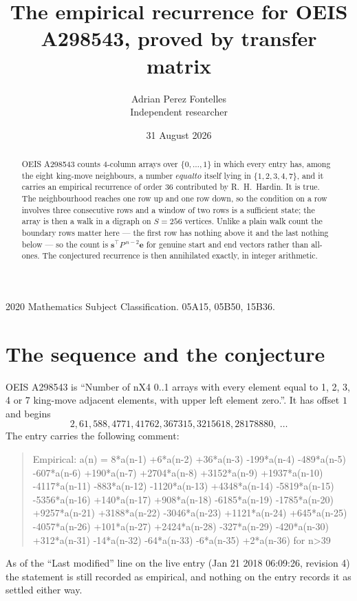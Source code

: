 \documentclass[11pt,a4paper]{article}
\title{The empirical recurrence for OEIS A298543, proved by transfer matrix}
\author{Adrian Perez Fontelles\\ \small Independent researcher}
\date{31 August 2026}
\theoremstyle{plain}
\theoremstyle{definition}
\begin{document}
\maketitle

\begin{abstract}
OEIS A298543 counts $4$-column arrays over $\{0,\dots,1\}$ in which every entry has,
among the eight king-move neighbours, a number $equal to$ itself lying in $\{1,2,3,4,7\}$, and it carries an empirical
recurrence of order $36$ contributed by R.~H.~Hardin. It is true. The neighbourhood
reaches one row up and one row down, so the condition on a row involves three consecutive
rows and a window of two rows is a sufficient state; the array is then a walk in a digraph
on $S=256$ vertices. Unlike a plain walk count the boundary rows matter here --- the first
row has nothing above it and the last nothing below --- so the count is
$\mathbf{s}^{\!\top}P^{\,n-2}\mathbf{e}$ for genuine start and end vectors rather than
all-ones. The conjectured recurrence is then annihilated exactly, in integer arithmetic.
\end{abstract}

\noindent\small 2020 Mathematics Subject Classification. 05A15, 05B50, 15B36.\normalsize

\section{The sequence and the conjecture}

OEIS A298543 is ``Number of nX4 0..1 arrays with every element equal to 1, 2, 3, 4 or 7 king-move adjacent elements, with upper left element zero.''. It has offset
$1$ and begins
\[
2, 61, 588, 4771, 41762, 367315, 3215618, 28178880,\ \dots
\]
The entry carries the following comment:
\begin{quote}\small
Empirical: a(n) = 8*a(n-1) +6*a(n-2) +36*a(n-3) -199*a(n-4) -489*a(n-5) -607*a(n-6) +190*a(n-7) +2704*a(n-8) +3152*a(n-9) +1937*a(n-10) -4117*a(n-11) -883*a(n-12) -1120*a(n-13) +4348*a(n-14) -5819*a(n-15) -5356*a(n-16) +140*a(n-17) +908*a(n-18) -6185*a(n-19) -1785*a(n-20) +9257*a(n-21) +3188*a(n-22) -3046*a(n-23) +1121*a(n-24) +645*a(n-25) -4057*a(n-26) +101*a(n-27) +2424*a(n-28) -327*a(n-29) -420*a(n-30) +312*a(n-31) -14*a(n-32) -64*a(n-33) -6*a(n-35) +2*a(n-36) for n>39
\end{quote}
As of the ``Last modified'' line on the live entry (Jan 21 2018 06:09:26, revision
4) the statement is still recorded as empirical, and nothing on the entry
records it as settled either way.
\end{document}
